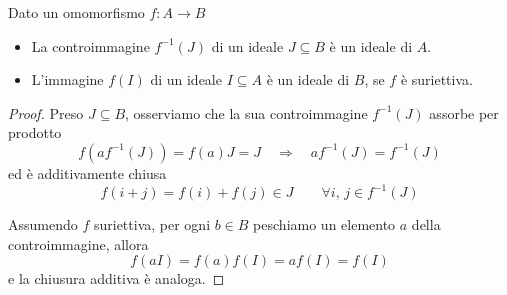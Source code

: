 \begin{multicols}{2}
\begin{prop}\label{immideali}
	Dato un omomorfismo $ f : A \to B $
	\begin{itemize}
		\item La controimmagine $ f^{-1}(J) $ di un ideale $ J \subseteq B $ è un ideale di $ A $.
		\item L'immagine $ f(I) $ di un ideale $ I \subseteq A $ è un ideale di $ B $, se $ f $ è suriettiva.
	\end{itemize}
\end{prop}
\begin{proof}
	Preso $ J \subseteq B $, osserviamo che la sua controimmagine $ f^{-1}(J) $ assorbe per prodotto
	\[ f(af^{-1}(J)) = f(a)J = J \quad\Rightarrow\quad af^{-1}(J) = f^{-1}(J)  \]
	ed è additivamente chiusa
	\[ f(i + j) = f(i) + f(j) \in J \qquad \forall i, \, j \in f^{-1}(J) \]
	
	Assumendo $ f $ suriettiva, per ogni $ b \in B $ peschiamo un elemento $ a $ della controimmagine, allora
	\[ f(aI) = f(a)f(I) = af(I) = f(I) \]
	e la chiusura additiva è analoga.
\end{proof}


\end{multicols}
